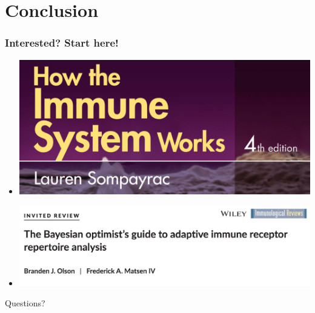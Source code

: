 \documentclass[mathserif,compress]{beamer}
\renewcommand\;{\,}
\begin{document}
\section{Conclusion}

\begin{frame}\frametitle{Interested? Start here!}
\begin{itemize}
\item[]
\begin{center}
\includegraphics[width=0.8 \linewidth]{Images/Sompayrac.png}
\end{center}
\bigskip
\item[]
\begin{center}
\includegraphics[width=\linewidth]{Images/Optimist.png}
\end{center}
\end{itemize}
\end{frame}

\begin{frame}
\begin{center}
\Huge
Questions?
\end{center}
\end{frame}
\end{document}
